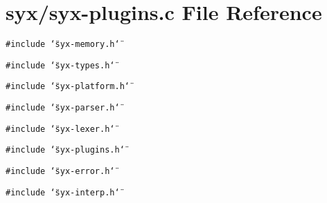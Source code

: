 \hypertarget{syx-plugins_8c}{
\section{syx/syx-plugins.c File Reference}
\label{syx-plugins_8c}
}
{\tt \#include \char`\"{}syx-memory.h\char`\"{}}\par
{\tt \#include \char`\"{}syx-types.h\char`\"{}}\par
{\tt \#include \char`\"{}syx-platform.h\char`\"{}}\par
{\tt \#include \char`\"{}syx-parser.h\char`\"{}}\par
{\tt \#include \char`\"{}syx-lexer.h\char`\"{}}\par
{\tt \#include \char`\"{}syx-plugins.h\char`\"{}}\par
{\tt \#include \char`\"{}syx-error.h\char`\"{}}\par
{\tt \#include \char`\"{}syx-interp.h\char`\"{}}\par

